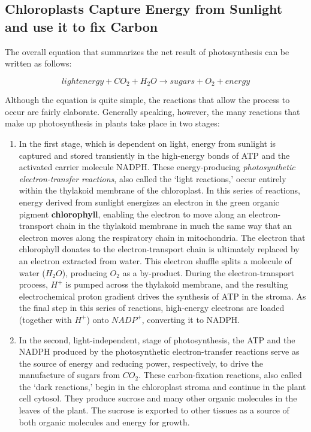 \subsection{Chloroplasts Capture Energy from Sunlight and use it to fix Carbon}

The overall equation that summarizes the net
result of photosynthesis can be written as follows:

$$
light energy + CO_{2} + H_{2}O \rightarrow sugars + O_{2} + energy
$$

Although the equation is quite simple, the reactions that allow the process
to occur are fairly elaborate. Generally speaking, however, the many
reactions that make up photosynthesis in plants take place in two stages:

\begin{enumerate}
\item In the first stage, which is dependent on light, energy from sunlight
is captured and stored transiently in the high-energy bonds
of ATP and the activated carrier molecule NADPH. These energy-producing
\textit{photosynthetic electron-transfer reactions}, also called the
`light reactions,' occur entirely within the thylakoid membrane of
the chloroplast. In this series of reactions, energy derived from
sunlight energizes an electron in the green organic pigment \textbf{chlorophyll},
enabling the electron to move along an electron-transport
chain in the thylakoid membrane in much the same way that an
electron moves along the respiratory chain in mitochondria. The
electron that chlorophyll donates to the electron-transport chain
is ultimately replaced by an electron extracted from water. This
electron shuffle splits a molecule of water ($H_{2}O$), producing $O_2$ as
a by-product. During the electron-transport process, $H^+$ is pumped
across the thylakoid membrane, and the resulting electrochemical
proton gradient drives the synthesis of ATP in the stroma. As
the final step in this series of reactions, high-energy electrons are
loaded (together with $H^+$) onto $NADP^+$, converting it to NADPH.
\item In the second, light-independent, stage of photosynthesis, the ATP
and the NADPH produced by the photosynthetic electron-transfer
reactions serve as the source of energy and reducing power,
respectively, to drive the manufacture of sugars from $CO_2$.
These carbon-fixation reactions, also called the `dark
reactions,' begin in the chloroplast stroma and continue in the
plant cell cytosol. They produce sucrose and many other organic
molecules in the leaves of the plant. The sucrose is exported to
other tissues as a source of both organic molecules and energy for
growth.
\end{enumerate}

